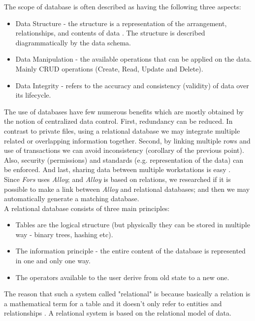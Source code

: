 \documentclass[oneside]{book}
\begin{document}
The scope of database is often described as having the following three aspects:
\begin{itemize}
  \item Data Structure - the structure is a representation of the arrangement, relationships, and contents of data \cite{datastruct}. The structure is described diagrammatically by the data schema.  
  \item Data Manipulation - the available operations that can be applied on the data. Mainly CRUD operations (Create, Read, Update and Delete).
  \item Data Integrity - refers to the accuracy and consistency (validity) of data over its lifecycle.
\end{itemize}

The use of databases have few numerous benefits which are mostly obtained by the notion of centralized data control. First, redundancy can be reduced. In contrast to private files, using a relational database we may integrate multiple related or overlapping information together. Second, by linking multiple rows and use of transactions we can avoid inconsistency (corollary of the previous point). Also, security (permissions) and standards (e.g. representation of the data) can be enforced. And last, sharing data between multiple workstations is easy \cite[p.~16]{introtodb}.\\

Since \textit{Fors} uses \textit{Alloy}; and \textit{Alloy} is based on relations, we researched if it is possible to make a link between \textit{Alloy} and relational databases; and then we may automatically generate a matching database.\\

A relational database consists of three main principles:
\begin{itemize}
	\item Tables are the logical structure (but physically they can be stored in multiple way - binary trees, hashing etc). 
	\item The information principle - the entire content of the database is represented in one and only one way.
	\item The operators available to the user derive from old state to a new one.
\end{itemize}

The reason that such a system called "relational" is because basically a relation is a mathematical term for a table and it doesn't only refer to entities and relationships \cite[p.~26]{introtodb}. A relational system is based on the relational model of data.\\
\end{document}
